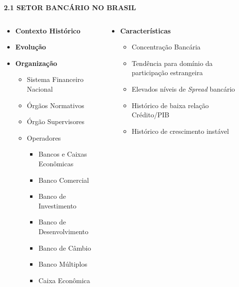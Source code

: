 \documentclass[
  ignorenonframetext,
  aspectratio=169,
  ignorenonframetext]{beamer}
\providecommand{\tightlist}{%
  \setlength{\itemsep}{0pt}\setlength{\parskip}{0pt}}
\begin{document}
\begin{frame}{\textbf{2.1 SETOR BANCÁRIO NO BRASIL}}
\protect\hypertarget{setor-bancuxe1rio-no-brasil}{}
\begin{columns}[T]
\begin{column}{0.5\textwidth}
\begin{itemize}
\item
  \textbf{Contexto Histórico}
\item
  \textbf{Evolução}
\item
  \textbf{Organização}

  \begin{itemize}
  \tightlist
  \item
    Sistema Financeiro Nacional
  \item
    Órgãos Normativos
  \item
    Órgão Supervisores
  \item
    Operadores

    \begin{itemize}
    \tightlist
    \item
      Bancos e Caixas Econômicas
    \item
      Banco Comercial
    \item
      Banco de Investimento
    \item
      Banco de Desenvolvimento
    \item
      Banco de Câmbio
    \item
      Banco Múltiplos
    \item
      Caixa Econômica
    \end{itemize}
  \end{itemize}
\end{itemize}
\end{column}

\begin{column}{0.5\textwidth}
\begin{itemize}
\tightlist
\item
  \textbf{Características}

  \begin{itemize}
  \tightlist
  \item
    Concentração Bancária
  \item
    Tendência para domínio da participação estrangeira
  \item
    Elevados níveis de \emph{Spread} bancário
  \item
    Histórico de baixa relação Crédito/PIB
  \item
    Histórico de crescimento instável
  \end{itemize}
\end{itemize}
\end{column}
\end{columns}
\end{frame}
\end{document}
